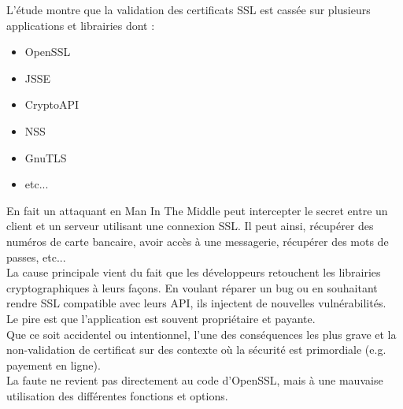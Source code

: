 \documentclass{article}
\begin{document}
	L'étude montre que la validation des certificats SSL est cassée
	sur plusieurs applications et librairies dont :
	\begin{itemize}
	\item OpenSSL
	\item JSSE
	\item CryptoAPI
	\item NSS
	\item GnuTLS
	\item etc...\\
	\end{itemize} 
	En fait un attaquant en Man In The Middle peut intercepter le
	secret entre un client et un serveur utilisant une connexion SSL.
	Il peut ainsi, récupérer des numéros de carte bancaire, avoir accès
	à une messagerie, récupérer des mots de passes, etc...\\
	
	La cause principale vient du fait que les développeurs retouchent
	les librairies cryptographiques à leurs façons. En voulant réparer
	un bug ou en souhaitant rendre SSL compatible avec leurs API, ils
	injectent de nouvelles vulnérabilités.\\
	Le pire est que l'application est souvent propriétaire et payante.\\
	
	Que ce soit accidentel ou intentionnel, l'une des conséquences 
	les plus grave et la non-validation de certificat
	sur des contexte où la sécurité est primordiale (e.g. 
	payement en ligne).\\
	
	La faute ne revient pas directement au code d'OpenSSL, mais à une
	mauvaise utilisation des différentes fonctions et options.\\
	
\end{document}
